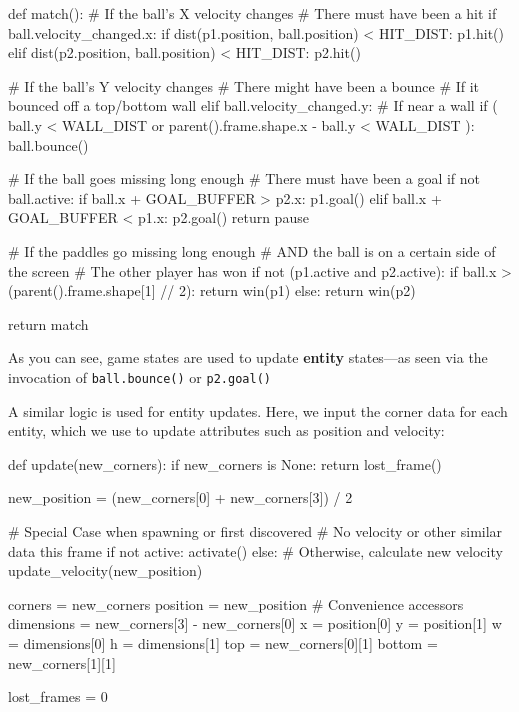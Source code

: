 \documentclass{report}
\newcommand{\state}[1]{\textbf{#1}}
\begin{document}
\begin{codeblock}
def match():
    # If the ball's X velocity changes
    # There must have been a hit
    if ball.velocity_changed.x:
        if dist(p1.position, ball.position) < HIT_DIST:
            p1.hit()
        elif dist(p2.position, ball.position) < HIT_DIST:
            p2.hit()

    # If the ball's Y velocity changes
    # There might have been a bounce
    # If it bounced off a top/bottom wall
    elif ball.velocity_changed.y:
        # If near a wall
        if (
            ball.y < WALL_DIST
            or 
            parent().frame.shape.x - ball.y < WALL_DIST
        ):
            ball.bounce()

    # If the ball goes missing long enough
    # There must have been a goal
    if not ball.active:
        if ball.x + GOAL_BUFFER > p2.x:
            p1.goal()
        elif ball.x + GOAL_BUFFER < p1.x:
            p2.goal()
        return pause

    # If the paddles go missing long enough
    # AND the ball is on a certain side of the screen
    # The other player has won
    if not (p1.active and p2.active):
        if ball.x > (parent().frame.shape[1] // 2):
            return win(p1)
        else:
            return win(p2)

    return match
\end{codeblock}

As you can see, game states are used to update \state{entity} states---as seen via the invocation of \texttt{ball.bounce()} or \texttt{p2.goal()} 

A similar logic is used for entity updates. Here, we input the corner data for each entity, which we use to update attributes such as position and velocity:

\begin{codeblock}
def update(new_corners):
    if new_corners is None:
        return lost_frame()
    
    new_position = (new_corners[0] + new_corners[3]) / 2

    # Special Case when spawning or first discovered
    # No velocity or other similar data this frame
    if not active:
        activate()
    else: # Otherwise, calculate new velocity 
        update_velocity(new_position)

    corners = new_corners
    position = new_position
    # Convenience accessors
    dimensions = new_corners[3] - new_corners[0]
    x = position[0]
    y = position[1]
    w = dimensions[0]
    h = dimensions[1]
    top = new_corners[0][1]
    bottom = new_corners[1][1]

    lost_frames = 0
\end{codeblock}
\end{document}

